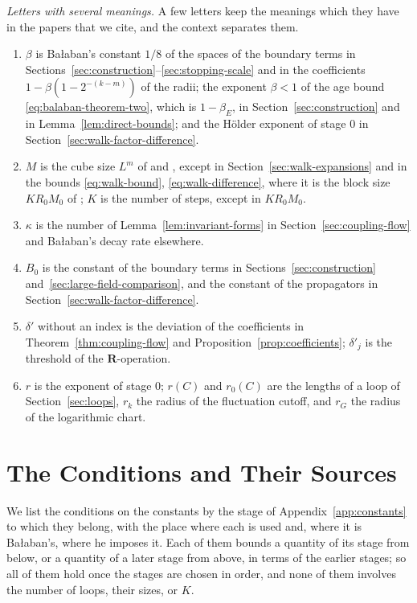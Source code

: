 \documentclass[11pt]{preprint}
\numberwithin{equation}{section}
\theoremstyle{definition}
\theoremstyle{remark}
\theoremstyle{plain}
\begin{document}
\emph{Letters with several meanings.} A few letters keep the meanings which they have in the papers that we cite, and the context separates them.
\begin{enumerate}[label=(\roman*)]
\item $\beta$ is Ba{\l}aban's constant $1/8$ of the spaces of the boundary terms in Sections~\ref{sec:construction}--\ref{sec:stopping-scale} and in the coefficients $1 - \beta(1 - 2^{-(k-m)})$ of the radii; the exponent $\beta < 1$ of the age bound \eqref{eq:balaban-theorem-two}, which is $1 - \beta_E$, in Section~\ref{sec:construction} and in Lemma~\ref{lem:direct-bounds}; and the H\"older exponent of stage $0$ in Section~\ref{sec:walk-factor-difference}.
\item $M$ is the cube size $L^m$ of \cite[p.~245]{BalabanCRE} and \cite[p.~257]{BalabanRG1}, except in Section~\ref{sec:walk-expansions} and in the bounds \eqref{eq:walk-bound}, \eqref{eq:walk-difference}, where it is the block size $KR_0M_0$ of \cite[p.~408]{BalabanPBG}; $K$ is the number of steps, except in $KR_0M_0$.
\item $\kappa$ is the number of Lemma~\ref{lem:invariant-forms} in Section~\ref{sec:coupling-flow} and Ba{\l}aban's decay rate elsewhere.
\item $B_0$ is the constant of the boundary terms \cite[(2.42)]{BalabanCRE} in Sections~\ref{sec:construction} and~\ref{sec:large-field-comparison}, and the constant of the propagators \cite[(3.42)]{BalabanPBG} in Section~\ref{sec:walk-factor-difference}.
\item $\delta'$ without an index is the deviation of the coefficients in Theorem~\ref{thm:coupling-flow} and Proposition~\ref{prop:coefficients}; $\delta'_j$ is the threshold of the $\mathbf R$-operation.
\item $r$ is the exponent of stage $0$; $r(C)$ and $r_0(C)$ are the lengths of a loop of Section~\ref{sec:loops}, $r_k$ the radius of the fluctuation cutoff, and $r_G$ the radius of the logarithmic chart.
\end{enumerate}

\section{The Conditions and Their Sources}\label{app:conditions}

We list the conditions on the constants by the stage of Appendix~\ref{app:constants} to which they belong, with the place where each is used and, where it is Ba{\l}aban's, where he imposes it. Each of them bounds a quantity of its stage from below, or a quantity of a later stage from above, in terms of the earlier stages; so all of them hold once the stages are chosen in order, and none of them involves the number of loops, their sizes, or $K$.
\end{document}
